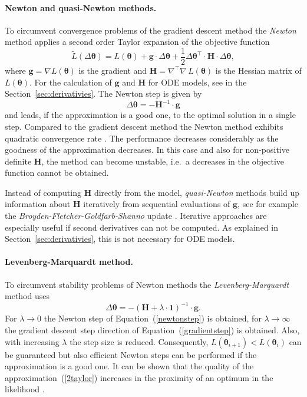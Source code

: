 \documentclass[12pt,a4paper]{scrartcl}
\begin{document}
\paragraph{Newton and quasi-Newton methods.}
To circumvent convergence problems of the gradient descent method the \emph{Newton} method applies a second order Taylor expansion of the objective function
\begin{equation}
	\tilde L(\Delta \boldsymbol{\theta}) = L(\boldsymbol{\theta}) + \mathbf{g} \cdot \Delta \boldsymbol{\theta} + \frac{1}{2} \Delta \boldsymbol{\theta}^\top \cdot \mathbf{H} \cdot \Delta \boldsymbol{\theta}, \label{2taylor}
\end{equation}
where $\mathbf{g} = \nabla L(\boldsymbol{\theta})$ is the gradient and $\mathbf{H} = \nabla^\top\nabla\, L(\boldsymbol{\theta})$ is the Hessian matrix of $L(\boldsymbol{\theta})$. For the calculation of $\mathbf{g}$ and $\mathbf{H}$ for ODE models, see in the Section~\ref{sec:derivativies}. The Newton step is given by 
\begin{equation}
	\Delta \boldsymbol{\theta} = -\mathbf{H}^{-1} \cdot \mathbf{g} \label{newtonstep}
\end{equation}
and leads, if the approximation is a good one, to the optimal solution in a single step. Compared to the gradient descent method the Newton method exhibits quadratic convergence rate \citep{Stoer:2005fk}. The performance decreases considerably as the goodness of the approximation decreases. In this case and also for non-positive definite $\mathbf{H}$, the method can become unstable, i.e.~a decreases in the objective function cannot be obtained. 

Instead of computing $\mathbf{H}$ directly from the model, \emph{quasi-Newton} methods build up information about $\mathbf{H}$ iteratively from sequential evaluations of $\mathbf{g}$, see for example the \emph{Broyden-Fletcher-Goldfarb-Shanno} update \citep{Shanno:1970fk}. Iterative approaches are especially useful if second derivatives can not be computed. As explained in Section~\ref{sec:derivativies}, this is not necessary for ODE models.

\paragraph{Levenberg-Marquardt method.}
To circumvent stability problems of Newton methods the \emph{Levenberg-Marquardt} method \citep{Marquardt:1963uq} uses 
\begin{equation}
	\Delta \boldsymbol{\theta} = -(\mathbf{H} + \lambda \cdot \mathbf{1})^{-1} \cdot 	\mathbf{g}. 
\end{equation}	
For $\lambda \rightarrow 0$ the Newton step of Equation~(\ref{newtonstep}) is obtained, for $\lambda \rightarrow \infty$ the gradient descent step direction of Equation~(\ref{gradientstep}) is obtained. Also, with increasing $\lambda$ the step size is reduced. Consequently, $L(\boldsymbol{\theta}_{i+1}) < L(\boldsymbol{\theta}_{i})$ can be guaranteed but also efficient Newton steps can be performed if the approximation is a good one. It can be shown that the quality of the approximation~(\ref{2taylor}) increases in the proximity of an optimum in the likelihood \citep{Seber:2003kq}.
\end{document}
